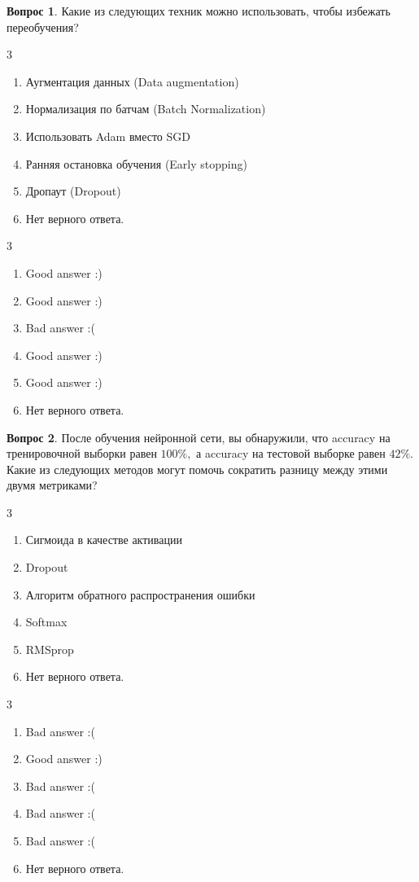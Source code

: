 \documentclass[12pt]{article}
\newenvironment{answerlist}[1][3]{
\begin{multicols}{#1}

\begin{enumerate}[label=\fbox{\emph{\Alph*}},ref=\emph{\alph*}]
}
{
\item Нет верного ответа.
\end{enumerate}
\end{multicols}
}
\theoremstyle{definition}
\newtheorem{question}{Вопрос}
\begin{document}
\begin{question}
Какие из следующих техник можно использовать, чтобы избежать переобучения? 
\begin{answerlist}
  \item Аугментация данных (Data augmentation)
  \item Нормализация по батчам (Batch Normalization)
  \item Использовать Adam вместо SGD
  \item Ранняя остановка обучения (Early stopping)
  \item Дропаут (Dropout)
\end{answerlist}
\end{question}

\begin{solution}
\begin{answerlist}
  \item Good answer :)
  \item Good answer :)
  \item Bad answer :(
  \item Good answer :)
  \item Good answer :)
\end{answerlist}
\end{solution}

\newpage 

\begin{question}
После обучения нейронной сети, вы обнаружили, что accuracy на тренировочной выборки равен $100\%,$  а accuracy на тестовой выборке равен $42\%$. Какие из следующих методов могут помочь сократить разницу между этими двумя метриками? 
\begin{answerlist}
  \item Сигмоида в качестве активации
  \item Dropout
  \item Алгоритм обратного распространения ошибки
  \item Softmax
  \item RMSprop
\end{answerlist}
\end{question}

\begin{solution}
\begin{answerlist}
  \item Bad answer :(
  \item Good answer :)
  \item Bad answer :(
  \item Bad answer :(
  \item Bad answer :(
\end{answerlist}
\end{solution}
\end{document}
